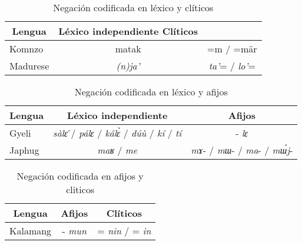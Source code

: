 \begin{table}[htbp]
\centering
\begin{tabular}{lcc}
\multicolumn{1}{c}{\textbf{Lengua}} & \textbf{Léxico independiente} \textbf{Clíticos} \\
\hline
Komnzo & matak & =m / =mär \\
Madurese & {\setmainfont{Charis SIL} \textit{(n)ja’}}  & {\setmainfont{Charis SIL} \textit{ta’}}= / {\setmainfont{Charis SIL} \textit{lo’}}= \\
\hline
\end{tabular}
\caption{Negación codificada en léxico y clíticos}
\label{cuadro16}
\end{table}

\begin{table}[htbp]
\centering
\begin{tabular}{lcc}
\multicolumn{1}{c}{\textbf{Lengua}} & \textbf{Léxico independiente} & \textbf{Afijos} \\
\hline
Gyeli & {\setmainfont{Charis SIL} \textit{sàlɛ}} ́/ {\setmainfont{Charis SIL} \textit{pálɛ}} / {\setmainfont{Charis SIL} \textit{kálɛ̀}} / {\setmainfont{Charis SIL} \textit{dúù}} / {\setmainfont{Charis SIL} \textit{kí}} / {\setmainfont{Charis SIL} \textit{tí}} & -{\setmainfont{Charis SIL} \textit{lɛ}} \\
Japhug & {\setmainfont{Charis SIL} \textit{maʁ}} / {\setmainfont{Charis SIL} \textit{me}} & {\setmainfont{Charis SIL} \textit{mɤ}}- / {\setmainfont{Charis SIL} \textit{mɯ}}- / {\setmainfont{Charis SIL} \textit{ma}}- / {\setmainfont{Charis SIL} \textit{mɯ́j}}- \\
\hline
\end{tabular}
\caption{Negación codificada en léxico y afijos}
\label{cuadro17}
\end{table}

\begin{table}[htbp]
\centering
\begin{tabular}{lcc}
\multicolumn{1}{c}{\textbf{Lengua}} & \textbf{Afijos} & \textbf{Clíticos} \\
\hline
Kalamang & -{\setmainfont{Charis SIL} \textit{mun}}  & ={\setmainfont{Charis SIL} \textit{nin}} / ={\setmainfont{Charis SIL} \textit{in}} \\
\hline
\end{tabular}
\caption{Negación codificada en afijos y cliticos}
\label{cuadro18}
\end{table}